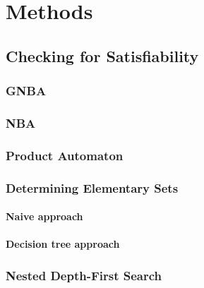 \section{Methods}
\subsection{Checking for Satisfiability}
\subsubsection{GNBA}
\subsubsection{NBA}
\subsubsection{Product Automaton}

\subsubsection{Determining Elementary Sets}
\paragraph{Naive approach}
\paragraph{Decision tree approach}

\subsubsection{Nested Depth-First Search}

